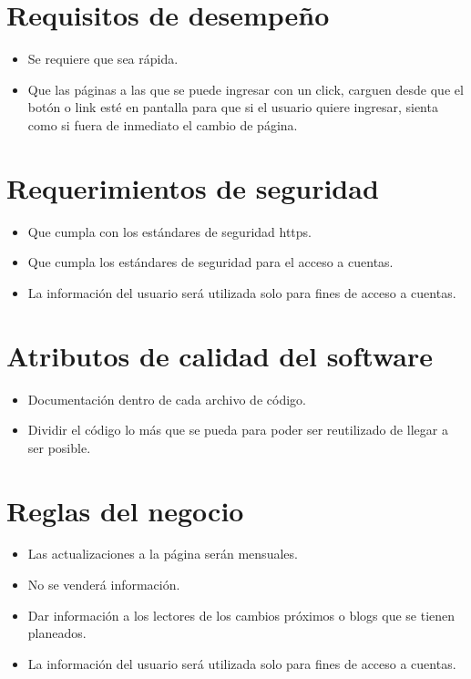 \documentclass{scrreprt}
\begin{document}
		\section{Requisitos de desempeño}
\begin{itemize}
	\item Se requiere que sea rápida.
	\item Que las páginas a las que se puede ingresar con un click, carguen desde que el botón o link esté en pantalla para que si el usuario quiere ingresar, sienta como si fuera de inmediato el cambio de página.
\end{itemize}
		
		
		\section{Requerimientos de seguridad}
\begin{itemize}
	\item Que cumpla con los estándares de seguridad https.
	\item Que cumpla los estándares de seguridad para el acceso a cuentas.
	\item La información del usuario será utilizada solo para fines de acceso a cuentas.
\end{itemize}
		
		\section{Atributos de calidad del software}
\begin{itemize}
	\item Documentación dentro de cada archivo de código.
	\item Dividir el código lo más que se pueda para poder ser reutilizado de llegar a ser posible.
\end{itemize}
		
		\section{Reglas del negocio}
\begin{itemize}
	\item Las actualizaciones a la página serán mensuales.
	\item No se venderá información.
	\item Dar información a los lectores de los cambios próximos o blogs que se tienen planeados.
	\item La información del usuario será utilizada solo para fines de acceso a cuentas.
\end{itemize}
\end{document}
